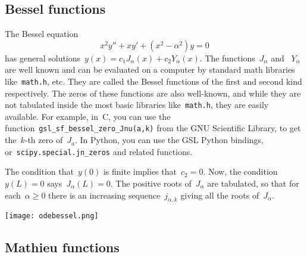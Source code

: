 \subsection{Bessel functions}

The Bessel equation
\begin{equation}\label{eq:bessel}
	x^2y''+xy'+(x^2-\alpha^2)y = 0
\end{equation}
has general solutions~$y(x)=c_1 J_{\alpha}(x)+c_2 Y_{\alpha}(x)$.
The functions~$J_\alpha$ and ~$Y_\alpha$ are well known and can be
evaluated on a computer by standard math libraries
like~\verb+math.h+, etc.
They are called the Bessel functions of the first and second kind
respectively.  The zeros of these functions are also well-known, and
while they are not tabulated inside the most basic libraries
like~\verb+math.h+, they are easily available.  For example,
in~C, you can use the function~\verb+gsl_sf_bessel_zero_Jnu(a,k)+ from the
GNU Scientific Library, to get the~$k$-th zero of~$J_a$.  In Python,
you can use the GSL Python bindings, or~\verb+scipy.special.jn_zeros+
and related functions.

The condition that~$y(0)$ is finite implies that~$c_2=0$.  Now, the
condition~$y(L)=0$ says~$J_\alpha(L)=0$.  The positive roots of~$J_\alpha$ are
tabulated, so that for each~$\alpha\ge 0$ there is an increasing
sequence~$j_{\alpha,k}$ giving all the roots of~$J_\alpha$.

\texttt{[image: odebessel.png]}


\subsection{Mathieu functions}




